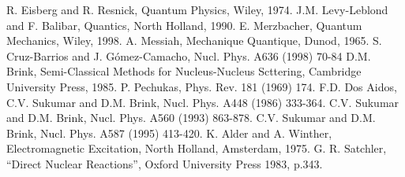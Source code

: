 \begin{references}
 R. Eisberg and R. Resnick, Quantum Physics,  Wiley, 1974.
 J.M. Levy-Leblond and F. Balibar, Quantics, North Holland, 1990.
 E. Merzbacher, Quantum Mechanics, Wiley, 1998.
 A. Messiah, Mechanique Quantique, Dunod, 1965.
 S. Cruz-Barrios and J. G\'omez-Camacho, Nucl. Phys. A636 (1998)
70-84
 D.M. Brink, Semi-Classical Methods for Nucleus-Nucleus 
Scttering, Cambridge University Press, 1985.                              
 P. Pechukas, Phys. Rev. 181 (1969) 174.
 F.D. Dos Aidos, C.V. Sukumar and D.M. Brink, Nucl. Phys. A448 
(1986) 333-364.
 C.V. Sukumar and D.M. Brink, Nucl. Phys. A560 (1993) 863-878.
 C.V. Sukumar and D.M. Brink, Nucl. Phys. A587 (1995) 413-420. 
 K. Alder and A. Winther, Electromagnetic Excitation, 
North Holland,  Amsterdam, 1975.
 G. R. Satchler, ``Direct Nuclear Reactions'', Oxford University
Press 1983, p.343.
\end{references} 









